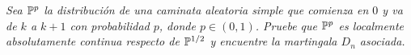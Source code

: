 \emph{
	Sea $ \mathbb{P} ^p$ la distribuci\'on de una caminata aleatoria simple 
	que comienza en $0$ y va de $k$ a $k+1$ con probabilidad $p$, 
	donde $p\in (0,1)$. Pruebe que $ \mathbb{P} ^p$ es localmente absolutamente 
	continua respecto de $ \mathbb{P} ^{1/2}$ y encuentre la martingala $D_n$ asociada.
}